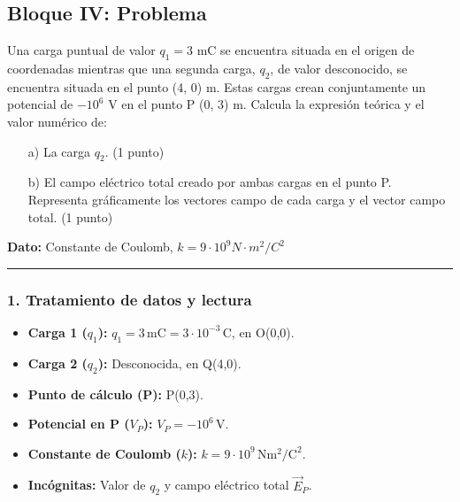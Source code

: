 \newpage

\subsection{Bloque IV: Problema}
\label{subsec:A4_2012_jun_ord}
\begin{cajaenunciado}
Una carga puntual de valor $q_{1}=3$ mC se encuentra situada en el origen de coordenadas mientras que una segunda carga, $q_{2}$, de valor desconocido, se encuentra situada en el punto (4, 0) m. Estas cargas crean conjuntamente un potencial de $-10^{6}$ V en el punto P (0, 3) m. Calcula la expresión teórica y el valor numérico de:
\begin{enumerate}
    \item[a)] La carga $q_2$. (1 punto)
    \item[b)] El campo eléctrico total creado por ambas cargas en el punto P. Representa gráficamente los vectores campo de cada carga y el vector campo total. (1 punto)
\end{enumerate}
\textbf{Dato:} Constante de Coulomb, $k=9\cdot10^{9}N\cdot m^{2}/C^{2}$
\end{cajaenunciado}
\hrule

\subsubsection*{1. Tratamiento de datos y lectura}
\begin{itemize}
    \item \textbf{Carga 1 ($q_1$):} $q_1 = 3\,\text{mC} = 3 \cdot 10^{-3}\,\text{C}$, en O(0,0).
    \item \textbf{Carga 2 ($q_2$):} Desconocida, en Q(4,0).
    \item \textbf{Punto de cálculo (P):} P(0,3).
    \item \textbf{Potencial en P ($V_P$):} $V_P = -10^6\,\text{V}$.
    \item \textbf{Constante de Coulomb ($k$):} $k = 9\cdot 10^9\,\text{N}\text{m}^2/\text{C}^2$.
    \item \textbf{Incógnitas:} Valor de $q_2$ y campo eléctrico total $\vec{E}_P$.
\end{itemize}

